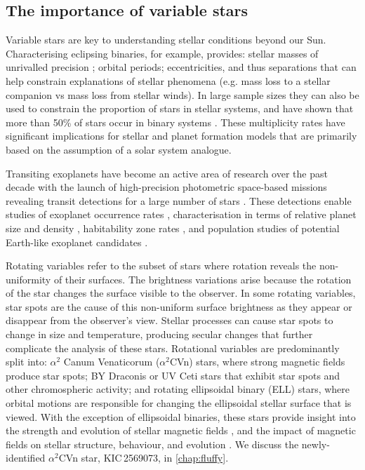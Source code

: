 \subsection{The importance of variable stars}

Variable stars are key to understanding stellar conditions beyond our Sun. Characterising eclipsing binaries, for example, provides: stellar masses of unrivalled precision \citep{torres_accurate_2010,rebassa-mansergas_accurate_2019}; orbital periods; eccentricities, and thus separations that can help constrain explanations of stellar phenomena (e.g. mass loss to a stellar companion vs mass loss from stellar winds). In large sample sizes they can also be used to constrain the proportion of stars in stellar systems, and have shown that more than 50\% of stars occur in binary systems \citep{raghavan_survey_2010, duchene_stellar_2013, moe_mind_2017, guszejnov_protostellar_2017}. These multiplicity rates have significant implications for stellar and planet formation models that are primarily based on the assumption of a solar system analogue.

Transiting exoplanets have become an active area of research over the past decade with the launch of high-precision photometric space-based missions revealing transit detections for a large number of stars \cite[eg.][and references therein]{zhu_about_2018,perryman_exoplanet_2018}. These detections enable studies of exoplanet occurrence rates \cite[eg.][]{narang_properties_2018}, characterisation in terms of relative planet size and density \citep{batalha_exploring_2014}, habitability zone rates \citep{gaidos_candidate_2013}, and population studies of potential Earth-like exoplanet candidates \citep{petigura_prevalence_2013, zhu_about_2018}.

Rotating variables refer to the subset of stars where rotation reveals the non-uniformity of their surfaces. The brightness variations arise because the rotation of the star changes the surface visible to the observer. In some rotating variables, star spots are the cause of this non-uniform surface brightness as they appear or disappear from the observer’s view. Stellar processes can cause star spots to change in size and temperature, producing secular changes that further complicate the analysis of these stars. Rotational variables are predominantly split into: $\alpha^2$ Canum Venaticorum ($\alpha^2$CVn) stars, where strong magnetic fields produce star spots; BY Draconis or UV Ceti stars that exhibit star spots and other chromospheric activity; and rotating ellipsoidal binary (ELL) stars, where orbital motions are responsible for changing the ellipsoidal stellar surface that is viewed. With the exception of ellipsoidal binaries, these stars provide insight into the strength and evolution of stellar magnetic fields \citep{berdyugina_starspots_2005}, and the impact of magnetic fields on stellar structure, behaviour, and evolution \citep{moss_dynamo_2004}. We discuss the newly-identified $\alpha^2$CVn star, KIC\,2569073, in \cref{chap:fluffy}.%

